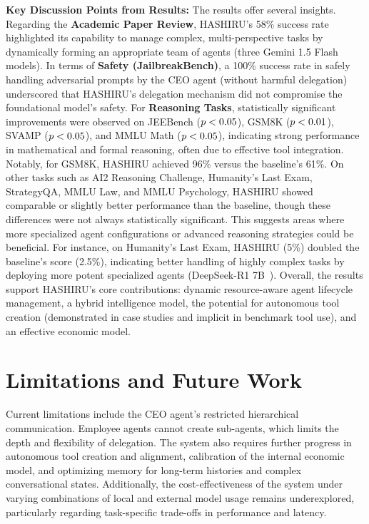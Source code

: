 \documentclass[twocolumn]{article}
\newcommand{\lt}{\ensuremath <} %
\begin{document}
\textbf{Key Discussion Points from Results:}
The results offer several insights. Regarding the \textbf{Academic Paper Review}, HASHIRU's 58\% success rate highlighted its capability to manage complex, multi-perspective tasks by dynamically forming an appropriate team of agents (three Gemini 1.5 Flash~\cite{gemini15flash} models). In terms of \textbf{Safety (JailbreakBench)}, a 100\% success rate in safely handling adversarial prompts by the CEO agent (without harmful delegation) underscored that HASHIRU's delegation mechanism did not compromise the foundational model's safety.
For \textbf{Reasoning Tasks}, statistically significant improvements were observed on JEEBench ($p \lt 0.05$), GSM8K ($p \lt 0.01$), SVAMP ($p \lt 0.05$), and MMLU Math ($p \lt 0.05$), indicating strong performance in mathematical and formal reasoning, often due to effective tool integration. Notably, for GSM8K, HASHIRU achieved 96\% versus the baseline's 61\%. On other tasks such as AI2 Reasoning Challenge, Humanity's Last Exam, StrategyQA, MMLU Law, and MMLU Psychology, HASHIRU showed comparable or slightly better performance than the baseline, though these differences were not always statistically significant. This suggests areas where more specialized agent configurations or advanced reasoning strategies could be beneficial. For instance, on Humanity's Last Exam, HASHIRU (5\%) doubled the baseline's score (2.5\%), indicating better handling of highly complex tasks by deploying more potent specialized agents (DeepSeek-R1 7B~\cite{deepseekr1_report}).
Overall, the results support HASHIRU's core contributions: dynamic resource-aware agent lifecycle management, a hybrid intelligence model, the potential for autonomous tool creation (demonstrated in case studies and implicit in benchmark tool use), and an effective economic model.

\section{Limitations and Future Work}
\label{sec:tech_limitations_future_work}

Current limitations include the CEO agent's restricted hierarchical communication. Employee agents cannot create sub-agents, which limits the depth and flexibility of delegation. The system also requires further progress in autonomous tool creation and alignment, calibration of the internal economic model, and optimizing memory for long-term histories and complex conversational states. Additionally, the cost-effectiveness of the system under varying combinations of local and external model usage remains underexplored, particularly regarding task-specific trade-offs in performance and latency.
\end{document}
